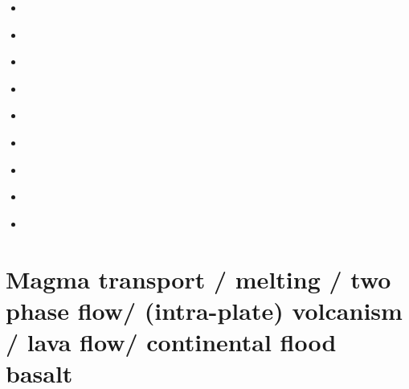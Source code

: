 \begin{scriptsize}
\begin{itemize}
\item[\nineteenninetythree] 
\textcite{sost93a} 
\textcite{sost93b} 
\item[\twothousandtwo] 
\textcite{elvh02} 
\item[\twothousandsix] 
\textcite{hosh06}
\item[\twothousandseven] 
\textcite{solo07} 
\item[\twothousandten] 
\textcite{devv10} 
\item[\twothousandtwelve] 
\textcite{ullc12} 
\item[\twothousandthirteen] 
\textcite{plth13} 
\textcite{moha13} 
\item[\twothousandfifteen] 
\textcite{maha15} 
\item[\twothousandtwenty] 
\textcite{bobm20} 
\textcite{agml20} 
\end{itemize}
\end{scriptsize}

\section{Magma transport / melting / two phase flow/ (intra-plate) volcanism / lava flow/ 
continental flood basalt}

